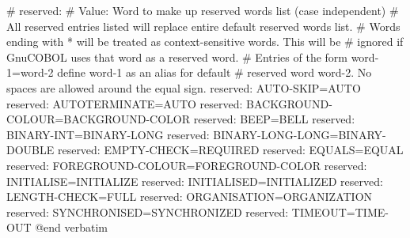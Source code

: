 # reserved:
# Value: Word to make up reserved words list (case independent)
# All reserved entries listed will replace entire default reserved words list.
#   Words ending with * will be treated as context-sensitive words. This will be
# ignored if GnuCOBOL uses that word as a reserved word.
#   Entries of the form word-1=word-2 define word-1 as an alias for default
# reserved word word-2. No spaces are allowed around the equal sign.
reserved:	AUTO-SKIP=AUTO
reserved:	AUTOTERMINATE=AUTO
reserved:	BACKGROUND-COLOUR=BACKGROUND-COLOR
reserved:	BEEP=BELL
reserved:	BINARY-INT=BINARY-LONG
reserved:	BINARY-LONG-LONG=BINARY-DOUBLE
reserved:	EMPTY-CHECK=REQUIRED
reserved:	EQUALS=EQUAL
reserved:	FOREGROUND-COLOUR=FOREGROUND-COLOR
reserved:	INITIALISE=INITIALIZE
reserved:	INITIALISED=INITIALIZED
reserved:	LENGTH-CHECK=FULL
reserved:	ORGANISATION=ORGANIZATION
reserved:	SYNCHRONISED=SYNCHRONIZED
reserved:	TIMEOUT=TIME-OUT
@end verbatim


